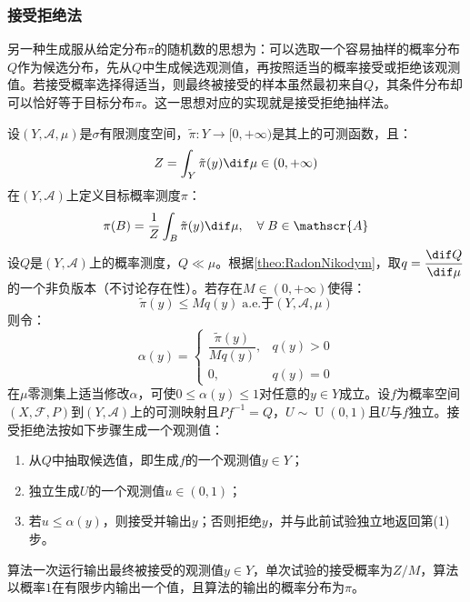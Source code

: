 \subsubsection{接受拒绝法}
另一种生成服从给定分布$\pi$的随机数的思想为：可以选取一个容易抽样的概率分布$Q$作为候选分布，先从$Q$中生成候选观测值，再按照适当的概率接受或拒绝该观测值。若接受概率选择得适当，则最终被接受的样本虽然最初来自$Q$，其条件分布却可以恰好等于目标分布$\pi$。这一思想对应的实现就是接受拒绝抽样法。
\begin{method}
	设$(Y,\mathscr{A},\mu)$是$\sigma$有限测度空间，$\tilde{\pi}:Y\to[0,+\infty)$是其上的可测函数，且：
	\begin{equation*}
		Z=\int_{Y}\tilde{\pi}(y)\dif\mu\in(0,+\infty)
	\end{equation*}
	在$(Y,\mathscr{A})$上定义目标概率测度$\pi$：
	\begin{equation*}
		\pi(B)=\frac{1}{Z}\int_{B}\tilde{\pi}(y)\dif\mu,\quad\forall\;B\in\mathscr{A}
	\end{equation*}
	设$Q$是$(Y,\mathscr{A})$上的概率测度，$Q\ll\mu$。根据\cref{theo:RadonNikodym}，取$q=\dfrac{\dif Q}{\dif\mu}$的一个非负版本（不讨论存在性）。若存在$M\in(0,+\infty)$使得：
	\begin{equation*}
		\tilde{\pi}(y)\leqslant Mq(y)\;\text{a.e.于}(Y,\mathscr{A},\mu)
	\end{equation*}
	则令：
	\begin{equation*}
		\alpha(y)=
		\begin{cases}
			\dfrac{\tilde{\pi}(y)}{Mq(y)},&q(y)>0 \\
			0,&q(y)=0
		\end{cases}
	\end{equation*}
	在$\mu$零测集上适当修改$\alpha$，可使$0\leqslant\alpha(y)\leqslant1$对任意的$y\in Y$成立。设$f$为概率空间$(X,\mathscr{F},P)$到$(Y,\mathscr{A})$上的可测映射且$Pf^{-1}=Q$，$U\sim\operatorname{U}(0,1)$且$U$与$f$独立。接受拒绝法按如下步骤生成一个观测值：
	\begin{enumerate}
		\item 从$Q$中抽取候选值，即生成$f$的一个观测值$y\in Y$；
		\item 独立生成$U$的一个观测值$u\in(0,1)$；
		\item 若$u\leqslant\alpha(y)$，则接受并输出$y$；否则拒绝$y$，并与此前试验独立地返回第(1)步。
	\end{enumerate}
	算法一次运行输出最终被接受的观测值$y\in Y$，单次试验的接受概率为$Z/M$，算法以概率$1$在有限步内输出一个值，且算法的输出的概率分布为$\pi$。
\end{method}
